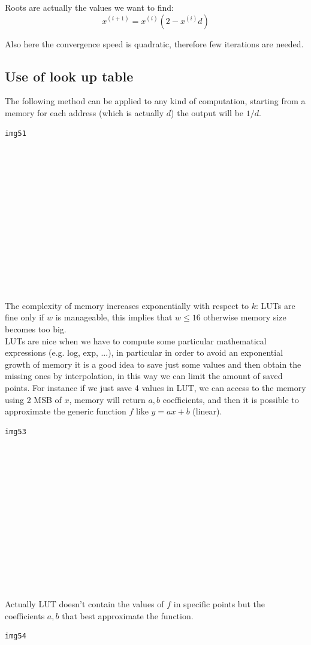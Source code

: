 Roots are actually the values we want to find:
$$x^{(i+1)}=x^{(i)}(2-x^{(i)}d)$$

Also here the convergence speed is quadratic, therefore few iterations are needed.

\subsection{Use of look up table}
The following method can be applied to any kind of computation, starting from a memory for each address (which is actually $d$) the output will be $1/d$.

\begin{verbatim}
img51














\end{verbatim}

The complexity of memory increases exponentially with respect to $k$: LUTs are fine only if $w$ is manageable, this implies that $w \leq 16$ otherwise memory size becomes too big.\\

LUTs are nice when we have to compute some particular mathematical expressions (e.g. log, exp, ...), in particular in order to avoid an exponential growth of memory it is a good idea to save just some values and then obtain the missing ones by interpolation, in this way we can limit the amount of saved points. For instance if we just save 4 values in LUT, we can access to the memory using 2 MSB of $x$, memory will return $a,b$ coefficients, and then it is possible to approximate the generic function $f$ like $y=ax+b$ (linear).

\begin{verbatim}
img53














\end{verbatim}

Actually LUT doesn't contain the values of $f$ in specific points but the coefficients $a,b$ that best approximate the function.

\begin{verbatim}
img54














\end{verbatim}

